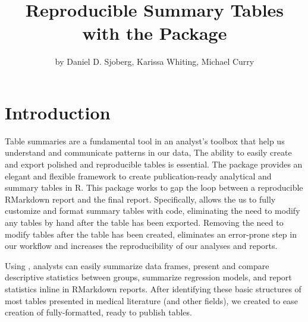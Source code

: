 \title{Reproducible Summary Tables with the  Package}
\author{by Daniel D. Sjoberg, Karissa Whiting, Michael Curry}

\maketitle



\section{Introduction}

Table summaries are a fundamental tool in an analyst's toolbox that help us understand and communicate patterns in our data,
The ability to easily create and export polished and reproducible tables is essential.
The  \citep{gtsummary} package provides an elegant and flexible framework to create publication-ready analytical and summary tables in R.
This package works to gap the loop between a reproducible RMarkdown report and the final report.
Specifically,  allows the us to fully customize and format summary tables with code, eliminating the need to modify any tables by hand after the table has been exported.
Removing the need to modify tables after the table has been created, eliminates an error-prone step in our workflow and increases the reproducibility of our analyses and reports. 

Using , analysts can easily summarize data frames, present and compare descriptive statistics between groups, summarize regression models, and report statistics inline in RMarkdown reports. 
After identifying these basic structures of most tables presented in medical literature (and other fields), we created  to ease creation of fully-formatted, ready to publish tables.

